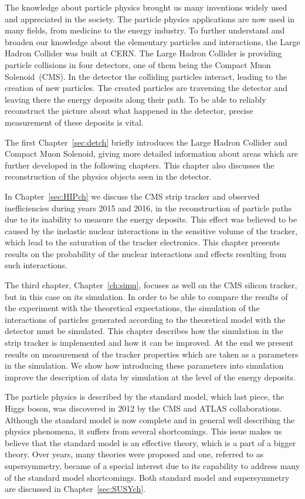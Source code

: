 
The knowledge about particle physics brought us many inventions widely used and appreciated in the society. The particle physics applications are now used in many fields, from medicine to the energy industry. To further understand and broaden our knowledge about the elementary particles and interactions, the Large Hadron Collider was built at CERN. The Large Hadron Collider is providing particle collisions in four detectors, one of them being the Compact Muon Solenoid~(CMS). In the detector the colliding particles interact, leading to the creation of new particles.  The created particles are traversing the detector and leaving there the energy deposits along their path. To be able to reliably reconstruct the picture about what happened in the detector, precise measurement of these deposits is vital.

The first Chapter~\ref{sec:detch} briefly introduces the Large Hadron Collider and Compact Muon Solenoid, giving more detailed information about areas which are further developed in the following chapters. This chapter also discusses the reconstruction of the physics objects seen in the detector.

In Chapter~\ref{sec:HIPch} we discuss the CMS strip tracker and observed inefficiencies during years 2015 and 2016, in the reconstruction of particle paths due to its inability to measure the energy deposits. This effect was believed to be caused by the inelastic nuclear interactions in the sensitive volume of the tracker, which lead to the saturation of the tracker electronics. This chapter presents results on the probability of the nuclear interactions and effects resulting from such interactions. 

The third chapter, Chapter~\ref{ch:simu}, focuses as well on the CMS silicon tracker, but in this case on its simulation. In order to be able to compare the results of the experiment with the theoretical expectations, the simulation of the interactions of particles generated according to the theoretical model with the detector must be simulated. This chapter describes how the simulation in the strip tracker is implemented and how it can be improved. At the end we present results on measurement of the tracker properties which are taken as a parameters in the simulation. We show how introducing these parameters into simulation improve the description of data by simulation at the level of the energy deposits.

The particle physics is described by the standard model, which last piece, the Higgs boson, was discovered in 2012 by the CMS and ATLAS collaborations. Although the standard model is now complete and in general well describing the physics phenomena, it suffers from several shortcomings. This issue makes us believe that the standard model is an effective theory, which is a part of a bigger theory. Over years, many theories  were proposed and one, referred to as supersymmetry, became of a special interest due to its capability to address many of the standard model shortcomings. Both standard model and supersymmetry are discussed in Chapter~\ref{sec:SUSYch}.

